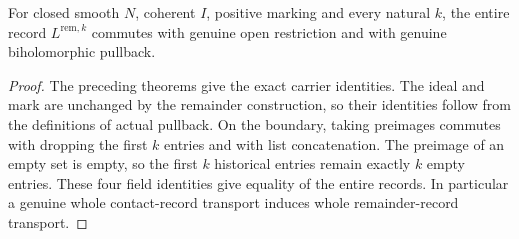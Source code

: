\begin{theorem}
\label{hir:zero-contact-remainder-transport-record}
\leanok
{}
For closed smooth $N$, coherent $I$, positive marking and every natural
$k$, the entire record $L^{\mathrm{rem},k}$ commutes with genuine open
restriction and with genuine biholomorphic pullback.
\end{theorem}
\begin{proof}
The preceding theorems give the exact carrier identities. The ideal and
mark are unchanged by the remainder construction, so their identities
follow from the definitions of actual pullback. On the boundary, taking
preimages commutes with dropping the first $k$ entries and with list
concatenation. The preimage of an empty set is empty, so the first $k$
historical entries remain exactly $k$ empty entries. These four field
identities give equality of the entire records. In particular a genuine
whole contact-record transport induces whole remainder-record transport.
\end{proof}

